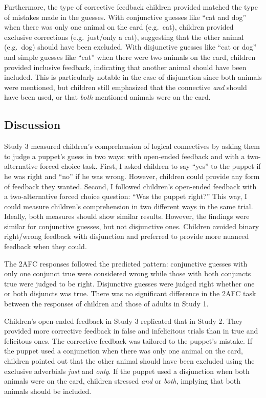 \documentclass[oneside]{report}
\theoremstyle{definition}
\theoremstyle{definition}
\theoremstyle{definition}
\theoremstyle{remark}
\begin{document}
Furthermore, the type of corrective feedback children provided matched
the type of mistakes made in the guesses. With conjunctive guesses like
``cat and dog'' when there was only one animal on the card (e.g.~cat),
children provided exclusive corrections (e.g.~just/only a cat),
suggesting that the other animal (e.g.~dog) should have been excluded.
With disjunctive guesses like ``cat or dog'' and simple guesses like
``cat'' when there were two animals on the card, children provided
inclusive feedback, indicating that another animal should have been
included. This is particularly notable in the case of disjunction since
both animals were mentioned, but children still emphasized that the
connective \emph{and} should have been used, or that \emph{both}
mentioned animals were on the card.

\subsection{Discussion}\label{discussion-3}

Study 3 measured children's comprehension of logical connectives by
asking them to judge a puppet's guess in two ways: with open-ended
feedback and with a two-alternative forced choice task. First, I asked
children to say ``yes'' to the puppet if he was right and ``no'' if he
was wrong. However, children could provide any form of feedback they
wanted. Second, I followed children's open-ended feedback with a
two-alternative forced choice question: ``Was the puppet right?'' This
way, I could measure children's comprehension in two different ways in
the same trial. Ideally, both measures should show similar results.
However, the findings were similar for conjunctive guesses, but not
disjunctive ones. Children avoided binary right/wrong feedback with
disjunction and preferred to provide more nuanced feedback when they
could.

The 2AFC responses followed the predicted pattern: conjunctive guesses
with only one conjunct true were considered wrong while those with both
conjuncts true were judged to be right. Disjunctive guesses were judged
right whether one or both disjuncts was true. There was no significant
difference in the 2AFC task between the responses of children and those
of adults in Study 1.

Children's open-ended feedback in Study 3 replicated that in Study 2.
They provided more corrective feedback in false and infelicitous trials
than in true and felicitous ones. The corrective feedback was tailored
to the puppet's mistake. If the puppet used a conjunction when there was
only one animal on the card, children pointed out that the other animal
should have been excluded using the exclusive adverbials \emph{just} and
\emph{only}. If the puppet used a disjunction when both animals were on
the card, children stressed \emph{and} or \emph{both}, implying that
both animals should be included.
\end{document}
